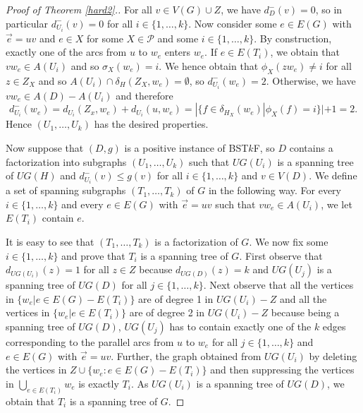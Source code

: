 \documentclass{article}
\begin{document}
\begin{proof}[Proof of Theorem \ref{hard2}.]
For all $v \in V(G)\cup Z$, we have $d_{D}^-(v)=0$, so in particular $d_{U_i}^-(v)=0$ for all $i \in \{1,\ldots,k\}$. Now consider some $e \in E(G)$ with $\vec{e}=uv$ and $e\in X$ for some $X \in \mathcal{P}$ and some $i \in \{1,\ldots,k\}$. By construction, exactly one of the arcs from $u$ to $w_e$ enters $w_e$.  If $e \in E(T_i)$, we obtain that $vw_e \in A(U_i)$ and so $\sigma_X(w_e)=i$. We hence obtain that $\phi_X(zw_e)\neq i$ for all $z \in Z_X$ and so $A(U_i)\cap \delta_H(Z_X,w_e)=\emptyset$, so $d_{U_i}^-(w_e)=2$. Otherwise, we have $vw_e \in A(D)-A(U_i)$ and therefore $$d_{U_i}^-(w_e)=d_{U_i}(Z_x,w_e)+d_{U_i}(u,w_e)=|\{f \in \delta_{H_X}(w_e)|\phi_X(f)=i\}|+1=2.$$ Hence $(U_1,\ldots,U_k)$ has the desired properties.
\medskip

Now suppose that  $(D,g)$ is a positive instance of  BST$k$F, so $D$ contains a factorization into subgraphs $(U_1,\ldots,U_k)$ such that $UG(U_i)$ is a spanning tree of $UG(H)$ and $d_{U_i}^-(v)\leq g(v)$ for all $i \in \{1,\ldots,k\}$ and $v \in V(D)$. We define a set of spanning subgraphs $(T_1,\ldots,T_k)$ of $G$ in the following way. For every $i \in \{1,\ldots,k\}$ and every $e \in E(G)$ with $\vec{e}=uv$ such that $vw_e \in A(U_i)$, we let $E(T_i)$ contain $e$.

It is easy to see that $(T_1,\ldots,T_k)$ is a factorization of $G$. We now fix some $i \in\{1,\ldots,k\}$ and prove that $T_i$ is a spanning tree of $G$. First observe that $d_{UG(U_i)}(z)=1$ for all $z \in Z$ because $d_{UG(D)}(z)=k$ and $UG(U_j)$ is a spanning tree of $UG(D)$ for all $j \in \{1,\ldots,k\}$. Next observe that all the vertices in $\{w_e|e \in E(G)-E(T_i)\}$ are of degree 1 in $UG(U_i)-Z$ and all the vertices in $\{w_e|e \in E(T_i)\}$ are of degree 2 in $UG(U_i)-Z$ because being a spanning tree of $UG(D)$, $UG(U_j)$ has to contain exactly one of the $k$ edges corresponding to the parallel arcs from $u$ to $w_e$ for all $j \in \{1,\ldots,k\}$ and $e \in E(G)$ with $\vec{e}=uv$. Further, the graph obtained from $UG(U_i)$ by deleting the vertices in $Z \cup \{w_e: e \in E(G)-E(T_i)\}$ and then suppressing the vertices in $\bigcup_{e \in E(T_i)}w_e$ is exactly $T_i$. As $UG(U_i)$ is a spanning tree of $UG(D)$, we obtain that $T_i$ is a spanning tree of $G$. 


\end{proof}
\end{document}
